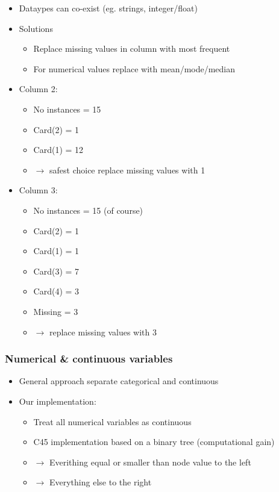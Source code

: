 \begin{frame}[allowframebreaks]
\begin{itemize}
\item Dataypes can co-exist (eg. strings, integer/float)
\vfill
\item Solutions
\begin{itemize}
\item Replace missing values in column with most frequent
\item For numerical values replace with mean/mode/median
\end{itemize}
\item Column 2:
\begin{itemize}
\item No instances = 15
\item Card(2) = 1
\item Card(1) = 12
\item $\rightarrow$ safest choice replace missing values with 1 
\end{itemize}
\item Column 3:
\begin{itemize}
\item No instances = 15 (of course)
\item Card(2) = 1 
\item Card(1) = 1
\item Card(3) = 7
\item Card(4) = 3
\item Missing = 3
\item $\rightarrow$ replace missing values with 3
\end{itemize}
\end{itemize}
\end{frame}

\begin{frame}
\frametitle{Numerical \& continuous variables}
\begin{itemize}
\item General approach separate categorical and continuous
\vfill
\item Our implementation:
\begin{itemize}
\vfill
\item Treat all numerical variables as continuous
\vfill
\item C45 implementation based on  a binary tree (computational gain)
\vfill
\item $\rightarrow$ Everithing equal or smaller than node value to the left
\vfill
\item $\rightarrow$ Everything else to the right
\end{itemize}
\end{itemize}
\end{frame}




